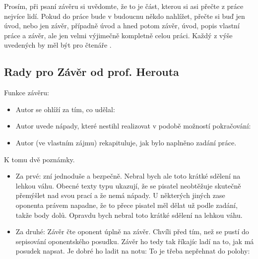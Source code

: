 Prosím, při psaní závěru si uvědomte, že to je část, kterou si asi přečte z práce nejvíce lidí. Pokud do práce bude v budoucnu někdo nahlížet, přečte si buď jen úvod, nebo jen závěr, případně úvod a hned potom závěr, úvod, popis vlastní práce a závěr, ale jen velmi výjimečně kompletně celou práci. Každý z výše uvedených  by měl být pro čtenáře .


\subsection*{Rady pro Závěr od prof. Herouta}
Funkce závěru:

\begin{itemize}
  \item{Autor se ohlíží za tím, co udělal: }
  \item{Autor uvede nápady, které nestihl realizovat v podobě možností pokračování: }
  \item{Autor (ve vlastním zájmu) rekapituluje, jak bylo naplněno zadání práce.}
\end{itemize}

\begin{samepage}
\noindent K tomu dvě poznámky.
\begin{itemize}
  \item{Za prvé:  zní jednoduše a bezpečně. Nebral bych ale toto krátké sdělení na lehkou váhu. Obecné texty typu  ukazují, že se pisatel neobtěžuje skutečně přemýšlet nad svou prací a že nemá nápady. U některých jiných  zase oponenta právem napadne, že to přece pisatel měl dělat už podle zadání, takže body dolů. Opravdu bych nebral toto krátké sdělení na lehkou váhu.}
  \item{Za druhé: Závěr čte oponent úplně na závěr. Chvíli před tím, než se pustí do sepisování oponentského posudku. Závěr ho tedy tak říkajíc ladí na to, jak má posudek napsat. Je dobré ho ladit na notu:  To je třeba nepřehnat do polohy: }
\end{itemize}
\end{samepage}

